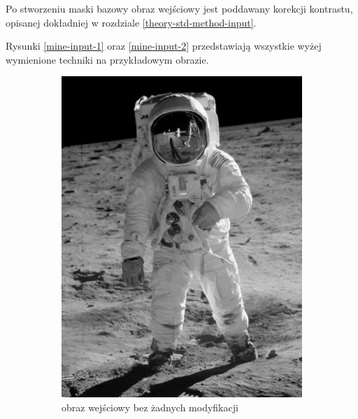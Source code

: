     Po stworzeniu maski bazowy obraz wejściowy jest poddawany korekcji kontrastu, opisanej dokładniej w rozdziale \ref{theory-std-method-input}.
    
    Rysunki \ref{mine-input-1} oraz \ref{mine-input-2} przedstawiają wszystkie wyżej wymienione techniki na przykładowym obrazie.
    \begin{figure}[htb] 
        \centering
        \begin{subfigure}{0.49\textwidth}
            \centering
            \includegraphics[width = \textwidth]{img/4-mine/input-input.png}
            \caption{obraz wejściowy bez żadnych modyfikacji}
            \label{mine-input-1-a}
        \end{subfigure}
        \begin{subfigure}{0.49\textwidth}
            \centering

\end{subfigure}
\end{figure}
